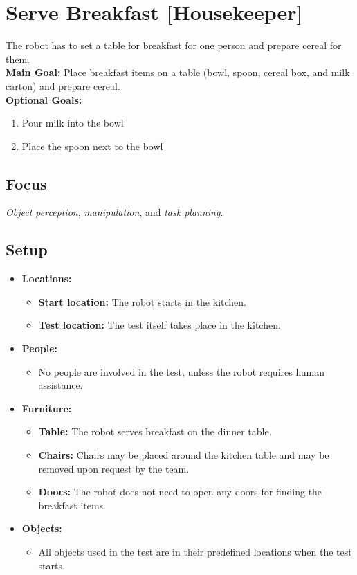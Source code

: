 \section{Serve Breakfast [Housekeeper]}
\label{test:serve-breakfast}
The robot has to set a table for breakfast for one person and prepare cereal for them.\\

\noindent \textbf{Main Goal:} Place breakfast items on a table (bowl, spoon, cereal box, and milk carton) and prepare cereal.\\

\noindent \textbf{Optional Goals:}
\begin{enumerate}[nosep]
	\item Pour milk into the bowl
	\item Place the spoon next to the bowl
\end{enumerate}

\subsection*{Focus}
\emph{Object perception}, \emph{manipulation}, and \emph{task planning}.

\subsection*{Setup}
\begin{itemize}[nosep]
	\item \textbf{Locations:}
		\begin{itemize}
			\item \textbf{Start location:} The robot starts in the kitchen.
			\item \textbf{Test location:} The test itself takes place in the kitchen.
		\end{itemize}
		\item \textbf{People:}
			\begin{itemize}
				\item No people are involved in the test, unless the robot requires human assistance.
			\end{itemize}
	\item \textbf{Furniture:}
		\begin{itemize}
			\item \textbf{Table:} The robot serves breakfast on the dinner table.
			\item \textbf{Chairs:} Chairs may be placed around the kitchen table and may be removed upon request by the team.
			\item \textbf{Doors:} The robot does not need to open any doors for finding the breakfast items.
		\end{itemize}
	\item \textbf{Objects:}
		\begin{itemize}
			\item All objects used in the test are in their predefined locations when the test starts.
		\end{itemize}
\end{itemize}

